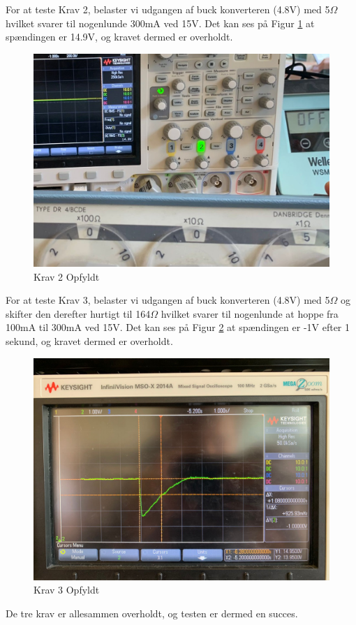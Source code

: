 \documentclass[../main.tex]{subfiles}
\begin{document}
For at teste Krav 2, belaster vi udgangen af buck konverteren (4.8V) med 5$\Omega$ hvilket svarer til nogenlunde 300mA ved 15V. Det kan ses på Figur \ref{fig: Krav 2 Opfyldt} at spændingen er 14.9V, og kravet dermed er overholdt.
\begin{figure}[H]
      \includegraphics[width=\textwidth]{Dokumentation/Pictures/Krav2.jpg}
     \caption{Krav 2 Opfyldt}
     \label{fig: Krav 2 Opfyldt}
     \end{figure}

For at teste Krav 3, belaster vi udgangen af buck konverteren (4.8V) med 5$\Omega$ og skifter den derefter hurtigt til 164$\Omega$ hvilket svarer til nogenlunde at hoppe fra 100mA til 300mA ved 15V. Det kan ses på Figur \ref{fig: Krav 3 Opfyldt} at spændingen er -1V efter 1 sekund, og kravet dermed er overholdt.
\begin{figure}[H]
      \includegraphics[width=\textwidth]{Dokumentation/Pictures/Krav3.jpg}
     \caption{Krav 3 Opfyldt}
     \label{fig: Krav 3 Opfyldt}
     \end{figure}

De tre krav er allesammen overholdt, og testen er dermed en succes. 

     
\end{document}
